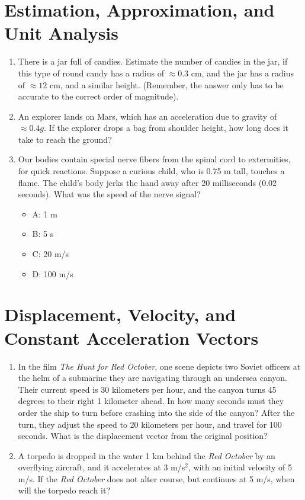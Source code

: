 \documentclass[10pt]{article}
\begin{document}
\maketitle

\section{Estimation, Approximation, and Unit Analysis}
\begin{enumerate}
\item There is a jar full of candies.  Estimate the number of candies in the jar, if this type of round candy has a radius of $\approx 0.3$ cm, and the jar has a radius of $\approx 12$ cm, and a similar height.  (Remember, the answer only has to be accurate to the correct order of magnitude). \vspace{1.5 cm}
\item An explorer lands on Mars, which has an acceleration due to gravity of $\approx 0.4 g$.  If the explorer drops a bag from shoulder height, how long does it take to reach the ground? \vspace{1.5 cm}
\item Our bodies contain special nerve fibers from the spinal cord to extermities, for quick reactions.  Suppose a curious child, who is 0.75 m tall, touches a flame.  The child's body jerks the hand away after 20 milliseconds (0.02 seconds).  What was the speed of the nerve signal? \\
\begin{itemize}
\item A: 1 m
\item B: 5 s
\item C: 20 m/s
\item D: 100 m/s
\end{itemize}
\end{enumerate}
\section{Displacement, Velocity, and Constant Acceleration Vectors}
\begin{enumerate}
\item In the film \textit{The Hunt for Red October}, one scene depicts two Soviet officers at the helm of a submarine they are navigating through an undersea canyon.  Their current speed is 30 kilometers per hour, and the canyon turns 45 degrees to their right 1 kilometer ahead.  In how many seconds must they order the ship to turn before crashing into the side of the canyon?  After the turn, they adjust the speed to 20 kilometers per hour, and travel for 100 seconds.  What is the displacement vector from the original position?\vspace{3cm}
\item A torpedo is dropped in the water 1 km behind the \textit{Red October} by an overflying aircraft, and it accelerates at 3 m/s$^2$, with an initial velocity of 5 m/s.  If the \textit{Red October} does not alter course, but continues at 5 m/s, when will the torpedo reach it?\vspace{3cm}
\end{enumerate}
\end{document}
